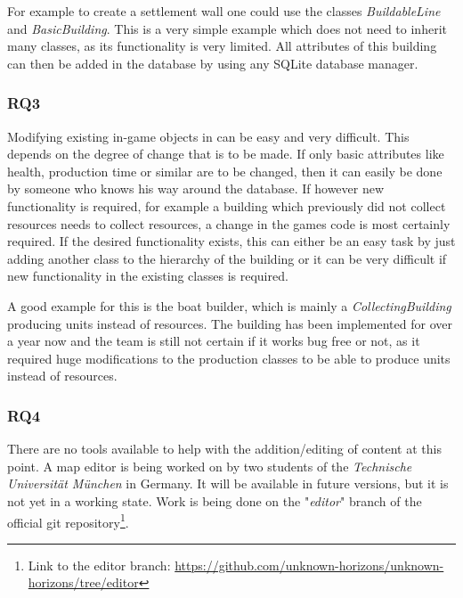 For example to create a settlement wall one could use the classes \textit{BuildableLine} and
\textit{BasicBuilding}. This is a very simple example which does not need to inherit many classes, as its functionality
is very limited. All attributes of this building can then be added in the database by using any SQLite database manager.

\subsubsection{RQ3}
Modifying existing in-game objects in \UH{} can be easy and very difficult. This depends on the degree of
change that is to be made. If only basic attributes like health, production time or similar are to be changed, then it
can easily be done by someone who knows his way around the database. If however new functionality is required, for
example a building which previously did not collect resources needs to collect resources, a change in the games code is
most certainly required. If the desired functionality exists, this can either be an easy task by just adding another class to
the hierarchy of the building or it can be very difficult if new functionality in the existing classes is required.

A good example for this is the boat builder, which is mainly a \textit{CollectingBuilding} producing units instead of
resources. The building has been implemented for over a year now and the team is still not certain if it works bug free
or not, as it required huge modifications to the production classes to be able to produce units instead of resources.

\subsubsection{RQ4}
There are no tools available to help with the addition/editing of content at this point. A map editor is being worked on
by two students of the \textit{Technische Universität München} in Germany. It will be available in future versions, but
it is not yet in a working state. Work is being done on the "\textit{editor}" branch of the official \UH{} git
repository\footnote{Link to the editor branch: \url{https://github.com/unknown-horizons/unknown-horizons/tree/editor}}.

